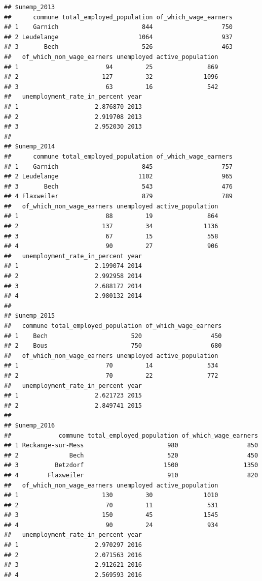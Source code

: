 \documentclass[]{gitbook}
\theoremstyle{definition}
\theoremstyle{definition}
\theoremstyle{definition}
\theoremstyle{remark}
\begin{document}
\begin{verbatim}
## $unemp_2013
##      commune total_employed_population of_which_wage_earners
## 1    Garnich                       844                   750
## 2 Leudelange                      1064                   937
## 3       Bech                       526                   463
##   of_which_non_wage_earners unemployed active_population
## 1                        94         25               869
## 2                       127         32              1096
## 3                        63         16               542
##   unemployment_rate_in_percent year
## 1                     2.876870 2013
## 2                     2.919708 2013
## 3                     2.952030 2013
## 
## $unemp_2014
##      commune total_employed_population of_which_wage_earners
## 1    Garnich                       845                   757
## 2 Leudelange                      1102                   965
## 3       Bech                       543                   476
## 4 Flaxweiler                       879                   789
##   of_which_non_wage_earners unemployed active_population
## 1                        88         19               864
## 2                       137         34              1136
## 3                        67         15               558
## 4                        90         27               906
##   unemployment_rate_in_percent year
## 1                     2.199074 2014
## 2                     2.992958 2014
## 3                     2.688172 2014
## 4                     2.980132 2014
## 
## $unemp_2015
##   commune total_employed_population of_which_wage_earners
## 1    Bech                       520                   450
## 2    Bous                       750                   680
##   of_which_non_wage_earners unemployed active_population
## 1                        70         14               534
## 2                        70         22               772
##   unemployment_rate_in_percent year
## 1                     2.621723 2015
## 2                     2.849741 2015
## 
## $unemp_2016
##             commune total_employed_population of_which_wage_earners
## 1 Reckange-sur-Mess                       980                   850
## 2              Bech                       520                   450
## 3          Betzdorf                      1500                  1350
## 4        Flaxweiler                       910                   820
##   of_which_non_wage_earners unemployed active_population
## 1                       130         30              1010
## 2                        70         11               531
## 3                       150         45              1545
## 4                        90         24               934
##   unemployment_rate_in_percent year
## 1                     2.970297 2016
## 2                     2.071563 2016
## 3                     2.912621 2016
## 4                     2.569593 2016
\end{verbatim}
\end{document}
